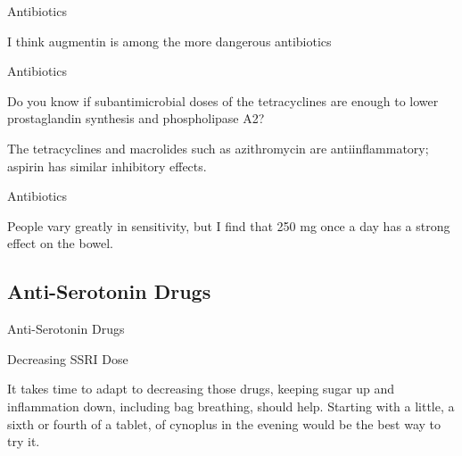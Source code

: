 \documentclass[11pt,oneside,openany,extrafontsizes]{memoir}
\begin{document}
\begin{standalonequote}{Antibiotics}

    \begin{answer}
      I think augmentin is among the more dangerous antibiotics
    \end{answer}
\end{standalonequote}

\begin{qaexchange}{Antibiotics}

    \begin{question}
        Do you know if subantimicrobial doses of the tetracyclines are enough to lower prostaglandin synthesis and phospholipase A2? 
    \end{question}

    \begin{answer}
      The tetracyclines and macrolides such as azithromycin are antiinflammatory; aspirin has similar inhibitory effects.
    \end{answer}
\end{qaexchange}

\begin{standalonequote}{Antibiotics}

    \begin{answer}
      People vary greatly in sensitivity, but I find that 250 mg once a day has a strong effect on the bowel.
    \end{answer}
\end{standalonequote}

\subsection{Anti-Serotonin Drugs}

\begin{standalonequote}{Anti-Serotonin Drugs}
    \begin{note}
        Decreasing SSRI Dose
    \end{note}

    \begin{answer}
        It takes time to adapt to decreasing those drugs, keeping sugar up and inflammation down, including bag breathing, should help. Starting with a little, a sixth or fourth of a tablet, of cynoplus in the evening would be the best way to try it.
    \end{answer}
\end{standalonequote}
\end{document}
